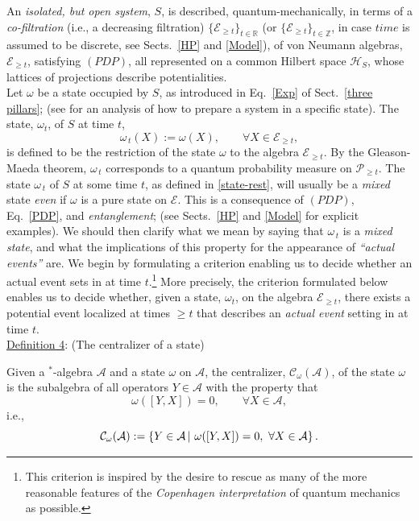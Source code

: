 \documentclass[a4paper,11pt]{article}
\begin{document}
An \textit{isolated, but open system}, $S$, is described, quantum-mechanically, in terms of a \textit{co-filtration} (i.e., a decreasing filtration)
$\lbrace \mathcal{E}_{\geq t} \rbrace_{t \in \mathbb{R}}$ (or $\lbrace \mathcal{E}_{\geq t} \rbrace_{t \in \mathbb{Z}}$, in case $time$ is assumed to be discrete, see Sects.~\ref{HP} and \ref{Model}), of von 
Neumann algebras, $\mathcal{E}_{\geq t}$, satisfying $(PDP)$, all represented on a common Hilbert space $\mathcal{H}_S$, 
whose lattices of projections describe potentialities. \\

Let $\omega$ be a state occupied by $S$, as introduced in Eq.~\eqref{Exp} of Sect.~\ref{three pillars}; (see \cite{Fr-Schub} for an analysis of how to prepare a system in a specific state). The state, 
$\omega_t$, of $S$ at time $t$,
\begin{equation}\label{state-rest}
\omega_{\,t}(X):= \omega(X), \qquad \forall X \in \mathcal{E}_{\geq t},
\end{equation}
is defined to be the restriction of the state $\omega$ to the algebra $\mathcal{E}_{\geq t}$. By the Gleason-Maeda theorem, 
$\omega_{\,t}$  
corresponds to a quantum probability measure on $\mathcal{P}_{\geq t}$. The state $\omega_{\,t}$ of $S$ 
at some time $t$, as defined in \eqref{state-rest}, will usually be a \textit{mixed} state  \textit{even} if $\omega$ 
is a pure state on $\mathcal{E}$. This is a consequence of $(PDP)$, Eq.~\eqref{PDP}, and \textit{entanglement}; (see Sects.~\ref{HP} and \ref{Model} for explicit examples). We should then clarify what we mean by saying that
$\omega_{\,t}$ is a \textit{mixed state}, and what the implications of this property for the appearance 
of \textit{``actual events''} are.
We begin by formulating a criterion enabling us to decide whether an actual event sets in at time 
$t$.\footnote{This criterion is inspired by the desire to rescue as many of the more reasonable features of the \textit{Copenhagen interpretation} of quantum mechanics as possible.} More precisely, the criterion formulated below 
enables us to decide whether, given a state, $\omega_t$, on the algebra $\mathcal{E}_{\geq t}$, there exists a potential 
event localized at times $\geq t$ that describes an \textit{actual event} setting in at time $t$.\\

\underline{Definition 4}: (The centralizer of a state) \label{defcentralizer}

Given a $^{*}$-algebra $\mathcal{A}$ and a state $\omega$ on $\mathcal{A}$, the centralizer, 
$\mathcal{C}_{\omega}(\mathcal{A})$, of the state $\omega$ is the subalgebra of all operators $Y \in \mathcal{A}$ 
with the property that 
$$\omega([Y, X]) =0, \qquad \forall X \in \mathcal{A},$$
i.e.,
$$\hspace{2.8cm}\mathcal{C}_{\omega}(\mathcal{A}):=\left\{Y\in \mathcal{A}\, \vert \,\,\omega([Y, X]) =0, \,\,\forall X \in \mathcal{A}\right\} . 
\hspace{2.8cm} \square$$
\end{document}
